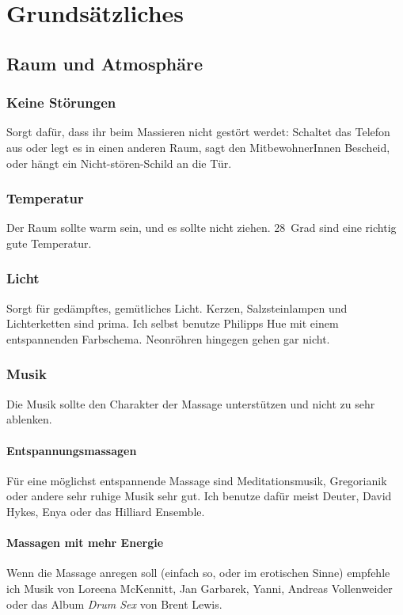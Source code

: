 \chapter{Grundsätzliches}

\section{Raum und Atmosphäre}

\subsection{Keine Störungen}

Sorgt dafür, dass ihr beim Massieren nicht gestört werdet: Schaltet das Telefon aus oder legt es in einen anderen Raum, sagt den MitbewohnerInnen Bescheid, oder hängt ein Nicht-stören-Schild an die Tür.

\subsection{Temperatur}

Der Raum sollte warm sein, und es sollte nicht ziehen. 28~Grad sind eine richtig gute Temperatur.

\subsection{Licht}

Sorgt für gedämpftes, gemütliches Licht. Kerzen, Salzsteinlampen und Lichterketten sind prima. Ich selbst benutze Philipps Hue mit einem entspannenden Farbschema. Neonröhren hingegen gehen gar nicht.

\subsection{Musik}
Die Musik sollte den Charakter der Massage unterstützen und nicht zu sehr ablenken.

\subsubsection{Entspannungsmassagen}
Für eine möglichst entspannende Massage sind Meditationsmusik, Gregorianik oder andere sehr ruhige Musik sehr gut. Ich benutze dafür meist Deuter, David Hykes, Enya oder das Hilliard Ensemble.

\subsubsection{Massagen mit mehr Energie}
Wenn die Massage anregen soll (einfach so, oder im erotischen Sinne) empfehle ich Musik von Loreena McKennitt, Jan Garbarek, Yanni, Andreas Vollenweider oder das Album \emph{Drum Sex} von Brent Lewis.


